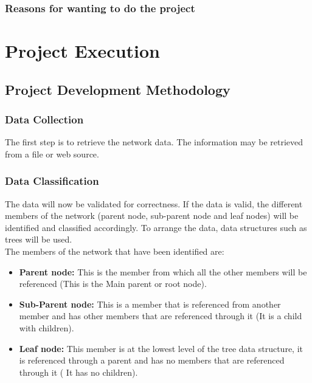 \documentclass[a4paper,12pt]{article}
\begin{document}
\subsubsection{Reasons for wanting to do the project}

\section{Project Execution}
\subsection{Project Development Methodology}
\label{Project Design Methodology}
\subsubsection{Data Collection}
The first step is to retrieve the network data. The information may be retrieved from a file or web source.
\subsubsection{Data Classification}
The data will now be validated for correctness. If the data is valid, the different members of the network (parent node, sub-parent node and leaf nodes)
will be identified and classified accordingly. To arrange the data, data structures such as trees will be used.\\
The members of the network that have been identified are:
\begin{itemize}
	\item \textbf{Parent node:} This is the member from which all the other members will be referenced (This is the Main parent or root node).
	\item \textbf{Sub-Parent node:} This is a member that is referenced from another member and has other members that are referenced through it (It is a child with children).
	\item \textbf{Leaf node:} This member is at the lowest level of the tree data structure, it is referenced through a parent and has no members that are referenced through it ( It has no children).
\end{itemize}
\newpage
\end{document}

